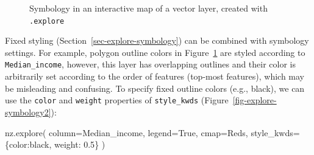 \documentclass[
  letterpaper,
]{krantz}
\newenvironment{Shaded}{\begin{snugshade}}{\end{snugshade}}
\newcommand{\FloatTok}[1]{\textcolor[rgb]{0.68,0.00,0.00}{#1}}
\newcommand{\NormalTok}[1]{\textcolor[rgb]{0.00,0.23,0.31}{#1}}
\newcommand{\OperatorTok}[1]{\textcolor[rgb]{0.37,0.37,0.37}{#1}}
\newcommand{\StringTok}[1]{\textcolor[rgb]{0.13,0.47,0.30}{#1}}
\newcommand{\VariableTok}[1]{\textcolor[rgb]{0.07,0.07,0.07}{#1}}
\begin{document}
\begin{figure}


\caption{\label{fig-explore-symbology}Symbology in an interactive map of
a vector layer, created with \texttt{.explore}}

\end{figure}%

Fixed styling (Section~\ref{sec-explore-symbology}) can be combined with
symbology settings. For example, polygon outline colors in
Figure~\ref{fig-explore-symbology} are styled according to
\texttt{\textquotesingle{}Median\_income\textquotesingle{}}, however,
this layer has overlapping outlines and their color is arbitrarily set
according to the order of features (top-most features), which may be
misleading and confusing. To specify fixed outline colors (e.g., black),
we can use the \texttt{color} and \texttt{weight} properties of
\texttt{style\_kwds} (Figure~\ref{fig-explore-symbology2}):

\begin{Shaded}
\begin{Highlighting}[]
\NormalTok{nz.explore(}
\NormalTok{    column}\OperatorTok{=}\StringTok{\textquotesingle{}Median\_income\textquotesingle{}}\NormalTok{, }
\NormalTok{    legend}\OperatorTok{=}\VariableTok{True}\NormalTok{, }
\NormalTok{    cmap}\OperatorTok{=}\StringTok{\textquotesingle{}Reds\textquotesingle{}}\NormalTok{,}
\NormalTok{    style\_kwds}\OperatorTok{=}\NormalTok{\{}\StringTok{\textquotesingle{}color\textquotesingle{}}\NormalTok{:}\StringTok{\textquotesingle{}black\textquotesingle{}}\NormalTok{, }\StringTok{\textquotesingle{}weight\textquotesingle{}}\NormalTok{: }\FloatTok{0.5}\NormalTok{\}}
\NormalTok{)}
\end{Highlighting}
\end{Shaded}
\end{document}
